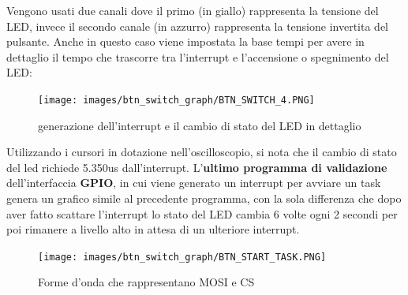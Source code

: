 \documentclass[12pt, a4paper, titlepage, oneside]{book}
\begin{document}
\newline
Vengono usati due canali dove il primo (in giallo) rappresenta la tensione del LED, invece il secondo canale (in azzurro) rappresenta la tensione invertita del pulsante.
Anche in questo caso viene impostata la base tempi per avere in dettaglio il tempo che trascorre tra l'interrupt e l'accensione o spegnimento del LED:
\newline
\begin{figure}[h]
    \centering
    \texttt{[image: images/btn\_switch\_graph/BTN\_SWITCH\_4.PNG]}
    \caption {generazione dell'interrupt e il cambio di stato del LED in dettaglio}
    \label{fig:btn_2}
\end{figure}
\newline
Utilizzando i cursori in dotazione nell'oscilloscopio, si nota che il cambio di stato del led richiede 5.350us dall'interrupt.\newline
\newpage
L'\textbf{ultimo programma di validazione} dell'interfaccia \textbf{GPIO}, in cui viene generato un interrupt per avviare un task genera un grafico simile al precedente programma, con la sola differenza che dopo aver fatto scattare l'interrupt lo stato del LED cambia 6 volte ogni 2 secondi per poi rimanere a livello alto in attesa di un ulteriore interrupt.\newline
\begin{figure}[h]
    \centering
    \texttt{[image: images/btn\_switch\_graph/BTN\_START\_TASK.PNG]}
        \caption{Forme d'onda che rappresentano MOSI e CS}
    \label{fig:gpio_graph2}
\end{figure}
\end{document}
